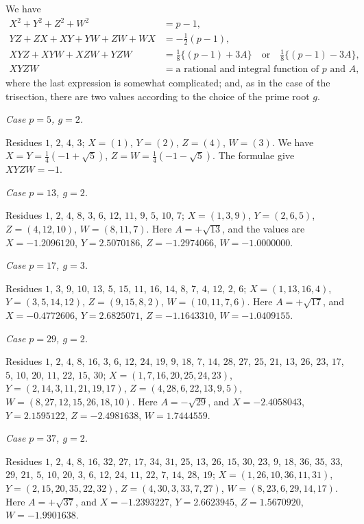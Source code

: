 \documentclass[12pt,a4paper]{article}
\theoremstyle{plain}
\begin{document}
We have
\begin{align*}
X^2+Y^2+Z^2+W^2 &= p-1,\\
YZ+ZX+XY+YW+ZW+WX &= -\tfrac{1}{2}(p-1),\\
XYZ+XYW+XZW+YZW &= \tfrac{1}{8}\{(p-1)+3A\} \quad\text{or}\quad
\tfrac{1}{8}\{(p-1)-3A\},\\
XYZW &= \text{a rational and integral function of $p$ and $A$},
\end{align*}
where the last expression is somewhat complicated; and, as in the case
of the trisection, there are two values according to the choice of the
prime root $g$.

\textit{Case $p=5$, $g=2$.}

Residues $1$, $2$, $4$, $3$; $X=(1)$, $Y=(2)$, $Z=(4)$, $W=(3)$.
We have $X=Y=\frac{1}{4}(-1+\sqrt{5})$, $Z=W=\frac{1}{4}(-1-\sqrt{5})$.
The formulae give $XYZW=-1$.

\textit{Case $p=13$, $g=2$.}

Residues $1$, $2$, $4$, $8$, $3$, $6$, $12$, $11$, $9$, $5$, $10$, $7$;
$X=(1,3,9)$, $Y=(2,6,5)$, $Z=(4,12,10)$, $W=(8,11,7)$.
Here $A=+\sqrt{13}$, and the values are $X=-1.2096120$,
$Y=2.5070186$, $Z=-1.2974066$, $W=-1.0000000$.

\textit{Case $p=17$, $g=3$.}

Residues $1$, $3$, $9$, $10$, $13$, $5$, $15$, $11$, $16$, $14$, $8$,
$7$, $4$, $12$, $2$, $6$; $X=(1,13,16,4)$, $Y=(3,5,14,12)$,
$Z=(9,15,8,2)$, $W=(10,11,7,6)$. Here $A=+\sqrt{17}$, and
$X=-0.4772606$, $Y=2.6825071$, $Z=-1.1643310$, $W=-1.0409155$.

\textit{Case $p=29$, $g=2$.}

Residues $1$, $2$, $4$, $8$, $16$, $3$, $6$, $12$, $24$, $19$, $9$, $18$,
$7$, $14$, $28$, $27$, $25$, $21$, $13$, $26$, $23$, $17$, $5$, $10$, $20$,
$11$, $22$, $15$, $30$; $X=(1,7,16,20,25,24,23)$,
$Y=(2,14,3,11,21,19,17)$, $Z=(4,28,6,22,13,9,5)$,
$W=(8,27,12,15,26,18,10)$. Here $A=-\sqrt{29}$, and
$X=-2.4058043$, $Y=2.1595122$, $Z=-2.4981638$, $W=1.7444559$.

\textit{Case $p=37$, $g=2$.}

Residues $1$, $2$, $4$, $8$, $16$, $32$, $27$, $17$, $34$, $31$, $25$,
$13$, $26$, $15$, $30$, $23$, $9$, $18$, $36$, $35$, $33$, $29$, $21$,
$5$, $10$, $20$, $3$, $6$, $12$, $24$, $11$, $22$, $7$, $14$, $28$, $19$;
$X=(1,26,10,36,11,31)$, $Y=(2,15,20,35,22,32)$,
$Z=(4,30,3,33,7,27)$, $W=(8,23,6,29,14,17)$.
Here $A=+\sqrt{37}$, and $X=-1.2393227$, $Y=2.6623945$,
$Z=1.5670920$, $W=-1.9901638$.
\end{document}
